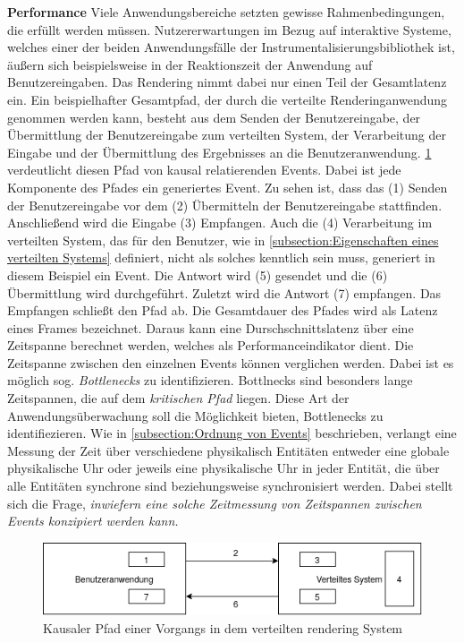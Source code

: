 \textbf{Performance} \space\space\space 
Viele Anwendungsbereiche setzten gewisse Rahmenbedingungen, die erfüllt werden müssen. 
Nutzererwartungen im Bezug auf interaktive Systeme, welches einer der beiden Anwendungsfälle der Instrumentalisierungsbibliothek ist, äußern sich beispielsweise in der Reaktionszeit der Anwendung auf Benutzereingaben. 
Das Rendering nimmt dabei nur einen Teil der Gesamtlatenz ein.
Ein beispielhafter Gesamtpfad, der durch die verteilte Renderinganwendung genommen werden kann, besteht aus dem Senden der Benutzereingabe, der Übermittlung der Benutzereingabe zum verteilten System, der Verarbeitung der Eingabe und der Übermittlung des Ergebnisses an die Benutzeranwendung.
\cref{fig:Anwendungsueberwachung_Gesamtsystem} verdeutlicht diesen Pfad von kausal relatierenden Events.
Dabei ist jede Komponente des Pfades ein generiertes Event.
Zu sehen ist, dass das (1) Senden der Benutzereingabe vor dem (2) Übermitteln der Benutzereingabe stattfinden.
Anschließend wird die Eingabe (3) Empfangen.
Auch die (4) Verarbeitung im verteilten System, das für den Benutzer, wie in \cref{subsection:Eigenschaften eines verteilten Systems} definiert, nicht als solches kenntlich sein muss, generiert in diesem Beispiel ein Event.
Die Antwort wird (5) gesendet und die (6) Übermittlung wird durchgeführt.
Zuletzt wird die Antwort (7) empfangen. Das Empfangen schließt den Pfad ab. Die Gesamtdauer des Pfades wird als Latenz eines Frames bezeichnet.
Daraus kann eine Durschschnittslatenz über eine Zeitspanne berechnet werden, welches als Performanceindikator dient. Die Zeitspanne zwischen den einzelnen Events können verglichen werden. Dabei ist es möglich sog. \emph{Bottlenecks} zu identifizieren. Bottlnecks sind besonders lange Zeitspannen, die auf dem \emph{kritischen Pfad} liegen. Diese Art der Anwendungsüberwachung soll die Möglichkeit bieten, Bottlenecks zu identifiezieren. Wie in \cref{subsection:Ordnung von Events} beschrieben, verlangt eine Messung der Zeit über verschiedene physikalisch Entitäten entweder eine globale physikalische Uhr oder jeweils eine physikalische Uhr in jeder Entität, die über alle Entitäten synchrone sind beziehungsweise synchronisiert werden. Dabei stellt sich die Frage, \emph{inwiefern eine solche Zeitmessung von Zeitspannen zwischen Events konzipiert werden kann. } 


\begin{figure}[!ht]
	\centering
	\includegraphics[scale=0.5]{img/Problembeschreibung/Anwendungsueberwachung_Gesamtsystem.png}
	\caption[Kausaler Pfad einer Vorgangs in dem verteilten rendering System]{Kausaler Pfad einer Vorgangs in dem verteilten rendering System}
	\label{fig:Anwendungsueberwachung_Gesamtsystem}
\end{figure}

